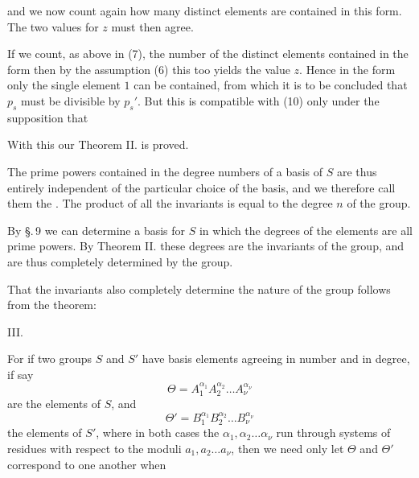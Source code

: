 
and we now count again how many distinct elements are contained
in this form. The two values for $z$ must then agree.

If we count, as above in (7), the number of the distinct
elements contained in the form
then by the assumption (6) this too yields the value $z$. Hence
in the form
only the single element $1$ can be contained, from which it is to be
concluded that $p_s$ must be divisible by $p_s'$. But this is compatible
with (10) only under the supposition that

With this our Theorem II. is proved.

The prime powers contained in the degree numbers of a basis
of $S$ are thus entirely independent of the particular choice of the
basis, and we therefore call them the . The product of all the invariants is equal to the degree $n$
of the group.

By \S.\,9 we can determine a basis for $S$ in which the
degrees of the elements are all prime powers. By
Theorem II. these degrees are the invariants of the group,
and are thus completely determined by the group.

That the invariants also completely determine the nature
of the group follows from the theorem:

III. 

For if two groups $S$ and $S'$ have basis elements agreeing
in number and in degree, if say
\[ \Theta = A_1^{\alpha_1} A_2^{\alpha_2} \ldots A_\nu^{\alpha_\nu} \]
are the elements of $S$, and
\[ \Theta' = B_1^{\alpha_1} B_2^{\alpha_2} \ldots B_\nu^{\alpha_\nu} \]
the elements of $S'$, where in both cases the $\alpha_1, \alpha_2 \ldots \alpha_\nu$ run through
systems of residues with respect to the moduli $a_1, a_2 \ldots a_\nu$, then we need
only let $\Theta$ and $\Theta'$ correspond to one another when
